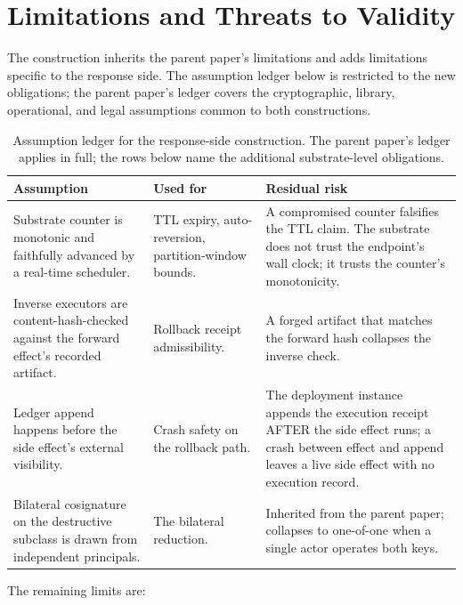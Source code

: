 \section{Limitations and Threats to Validity}
\label{sec:limitations-ra}

The construction inherits the parent paper's limitations and adds
limitations specific to the response side. The assumption ledger
below is restricted to the new obligations; the parent paper's ledger
covers the cryptographic, library, operational, and legal assumptions
common to both constructions.

\begin{table}[t]
\centering
\caption{Assumption ledger for the response-side construction. The
parent paper's ledger applies in full; the rows below name the
additional substrate-level obligations.}
\label{tab:assumptions-ra}
\small
\begin{tabularx}{\textwidth}{@{}>{\raggedright\arraybackslash}p{}>{\raggedright\arraybackslash}p{}>{\raggedright\arraybackslash}X@{}}
\toprule
Assumption & Used for & Residual risk \\
\midrule
Substrate counter is monotonic and faithfully advanced by a real-time scheduler. & TTL expiry, auto-reversion, partition-window bounds. & A compromised counter falsifies the TTL claim. The substrate does not trust the endpoint's wall clock; it trusts the counter's monotonicity. \\
Inverse executors are content-hash-checked against the forward effect's recorded artifact. & Rollback receipt admissibility. & A forged artifact that matches the forward hash collapses the inverse check. \\
Ledger append happens before the side effect's external visibility. & Crash safety on the rollback path. & The deployment instance appends the execution receipt AFTER the side effect runs; a crash between effect and append leaves a live side effect with no execution record. \\
Bilateral cosignature on the destructive subclass is drawn from independent principals. & The bilateral reduction. & Inherited from the parent paper; collapses to one-of-one when a single actor operates both keys. \\
\bottomrule
\end{tabularx}
\end{table}

The remaining limits are:

